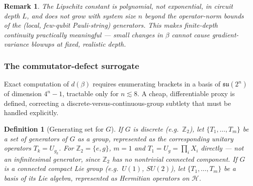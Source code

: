 \documentclass[pdflatex,sn-mathphys-num]{sn-jnl}
\theoremstyle{thmstyleone}
\theoremstyle{thmstyletwo}
\newtheorem{remark}{Remark}
\theoremstyle{thmstylethree}
\newtheorem{definition}{Definition}
\newcommand{\Hil}{\mathcal{H}}
\newcommand{\su}[1]{\mathfrak{su}(#1)}
\begin{document}
\begin{remark}
\label{rem:polynomial}
The Lipschitz constant is polynomial, not exponential, in circuit depth $L$, and does not grow with system size $n$ beyond the operator-norm bounds of the (local, few-qubit Pauli-string) generators. This makes finite-depth continuity practically meaningful --- small changes in $\beta$ cannot cause gradient-variance blowups at fixed, realistic depth.
\end{remark}

\subsubsection{The commutator-defect surrogate}
\label{sec:defect}

Exact computation of $d(\beta)$ requires enumerating brackets in a basis of $\su{2^n}$ of dimension $4^n - 1$, tractable only for $n \lesssim 8$. A cheap, differentiable proxy is defined, correcting a discrete-versus-continuous-group subtlety that must be handled explicitly.

\begin{definition}[Generating set for $G$]
\label{def:genset}
If $G$ is discrete (e.g.\ $\mathbb{Z}_2$), let $\{T_1,\ldots,T_m\}$ be a set of generators of $G$ as a group, represented as the corresponding unitary operators $T_k = U_{g_k}$. For $\mathbb{Z}_2 = \{e,g\}$, $m=1$ and $T_1 = U_g = \prod_i X_i$ directly — not an infinitesimal generator, since $\mathbb{Z}_2$ has no nontrivial connected component. If $G$ is a connected compact Lie group (e.g.\ $U(1)$, $SU(2)$), let $\{T_1,\ldots,T_m\}$ be a basis of its Lie algebra, represented as Hermitian operators on $\Hil$.
\end{definition}
\end{document}
